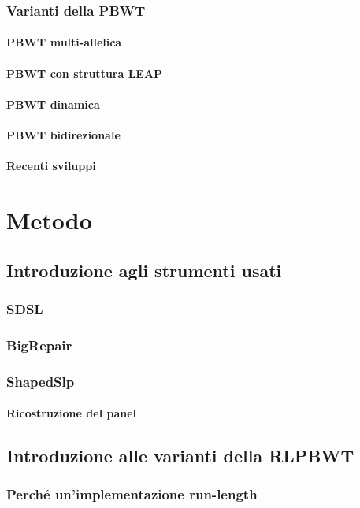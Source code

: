\documentclass[a4paper,12pt, oneside]{book}
\begin{document}
\subsection{Varianti della PBWT}
\subsubsection{PBWT multi-allelica}
\subsubsection{PBWT con struttura LEAP}
\subsubsection{PBWT dinamica}
\subsubsection{PBWT bidirezionale}
\subsubsection{Recenti sviluppi}
\chapter{Metodo}
\section{Introduzione agli strumenti usati}
\subsection{SDSL}
\subsection{BigRepair}
\subsection{ShapedSlp}
\subsubsection{Ricostruzione del panel}
\section{Introduzione alle varianti della RLPBWT}
\subsection{Perché un'implementazione run-length}
\end{document}
